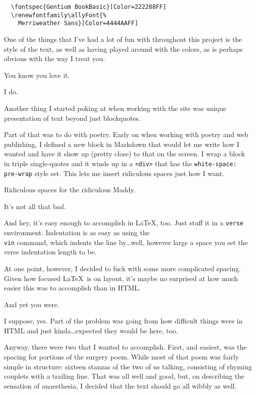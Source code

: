 \begin{paracol}{2}
\begin{leftcolumn}
\begin{description}
  \begin{verbatim}
  \fontspec{Gentium BookBasic}[Color=222288FF]
  \renewfontfamily\allyFont{%
    Merriweather Sans}[Color=4444AAFF]\end{verbatim}
\end{description}

One of the things that I've had a lot of fun with throughout this project is the style of the text, as well as having played around with the colors, as is perhaps obvious with the way I treat you.

\begin{ally}
  You know you love it.
\end{ally}
I do.

Another thing I started poking at when working with the site was unique presentation of text beyond just blockquotes.

Part of that was to do with poetry. Early on when working with poetry and web publishing, I defined a new block in Markdown that would let me write how I wanted and have it show up (pretty close) to that on the screen. I wrap a block in triple single-quotes and it winds up in a \texttt{<div>} that has the \texttt{white-space: pre-wrap} style set. This lets me insert ridiculous spaces just how I want.

\begin{ally}
  Ridiculous spaces for the ridiculous Maddy.
\end{ally}
It's not all that bad.

And hey, it's easy enough to accomplish in \LaTeX, too. Just stuff it in a \texttt{verse} environment. Indentation is as easy as using the \texttt{\\vin} command, which indents the line by\ldots{}well, however large a space you set the verse indentation length to be.

At one point, however, I decided to fuck with some more complicated spacing. Given how focused \LaTeX\ is on layout, it's maybe no surprised at how much easier this was to accomplish than in HTML.

\begin{ally}
  And yet you were.
\end{ally}
I suppose, yes. Part of the problem was going from how difficult things were in HTML and just kinda\ldots{}expected they would be here, too.

Anyway, there were two that I wanted to accomplish. First, and easiest, was the spacing for portions of the surgery poem. While most of that poem was fairly simple in structure: sixteen stanzas of the two of us talking, consisting of rhyming couplets with a trailing line. That was all well and good, but, on describing the sensation of anaesthesia, I decided that the text should go all wibbly as well.


\end{leftcolumn}
\end{paracol}
